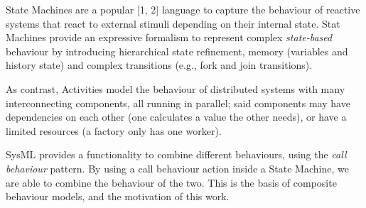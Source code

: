 State Machines are a popular [1, 2] language to capture the behaviour
of reactive systems\cite{HAREL1987231} that react to external stimuli depending on
their internal state. Stat Machines provide an expressive formalism to
represent complex \emph{state-based} behaviour by introducing hierarchical
state refinement, memory (variables and history state) and complex
transitions (e.g., fork and join transitions).

As contrast, Activities model the behaviour of distributed systems with many interconnecting components, all running in parallel; said components may have dependencies on each other (one calculates a value the other needs), or have a limited resources (a factory only has one worker).

SysML provides a functionality to combine different behaviours, using the \emph{call behaviour} pattern. By using a call behaviour action inside a State Machine, we are able to combine the behaviour of the two. This is the basis of composite behaviour models, and the motivation of this work. 
\fi